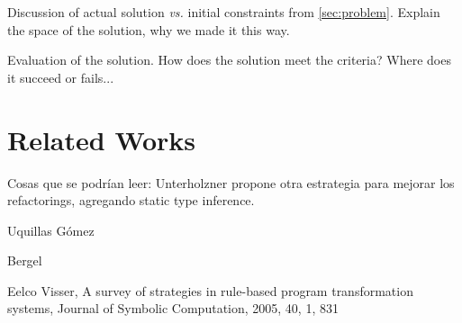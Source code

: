 \documentclass{article}
\begin{document}
Discussion of actual solution \emph{vs.} initial constraints from
\ref{sec:problem}. Explain the space of the solution, why we made it this way.

Evaluation of the solution. How does the solution meet the criteria? Where
does it succeed or fails...


\section{Related Works}
\label{sec:related}


Cosas que se podrían leer:
Unterholzner \cite{Unte12a} propone otra estrategia para mejorar los refactorings, agregando static type inference.

Uquillas Gómez \etal \cite{Uqui12a}

Bergel \etal \cite{Berg08c} 


Eelco Visser, A survey of strategies in rule-based program transformation systems, Journal of Symbolic Computation, 2005, 40, 1, 831


\end{document}
